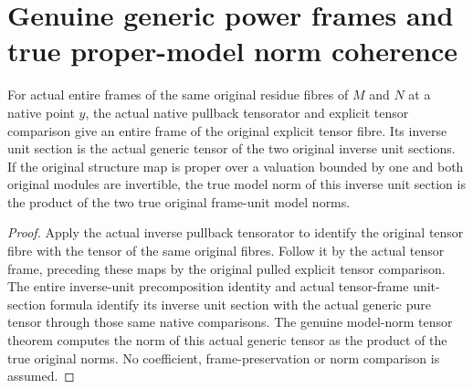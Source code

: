 \section{Genuine generic power frames and true proper-model norm coherence}

\begin{lemma}\label{lem:fc-generic-tensor-frame-unit-norm}
\leanok
{}
For actual entire frames of the same original residue fibres of
$M$ and $N$ at a native point $y$, the actual native pullback
tensorator and explicit tensor comparison give an entire frame
of the original explicit tensor fibre. Its inverse unit section
is the actual generic tensor of the two original inverse unit
sections. If the original structure map is proper over a valuation
bounded by one and both original modules are invertible, the true
model norm of this inverse unit section is the product of the
two true original frame-unit model norms.
\end{lemma}
\begin{proof}
Apply the actual inverse pullback tensorator to identify the
original tensor fibre with the tensor of the same original fibres.
Follow it by the actual tensor frame, preceding these maps by
the original pulled explicit tensor comparison. The entire
inverse-unit precomposition identity and actual tensor-frame
unit-section formula identify its inverse unit section with the
actual generic pure tensor through those same native comparisons.
The genuine model-norm tensor theorem computes the norm of this
actual generic tensor as the product of the true original norms.
No coefficient, frame-preservation or norm comparison is assumed.
\end{proof}

